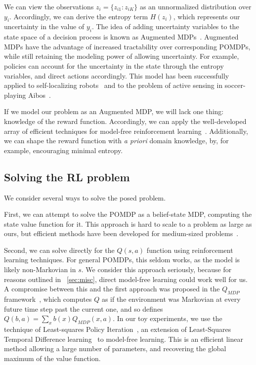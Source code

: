 We can view the observations $z_i = \{z_{i1}:z_{iK}\}$ as an unnormalized distribution over $y_i$.
Accordingly, we can derive the entropy term $H(z_i)$, which represents our uncertainty in the value of $y_i$.
The idea of adding uncertainty variables to the state space of a decision process is known as Augmented MDPs~\cite{Kwok2004,Roy1999}.
Augmented MDPs have the advantage of increased tractability over corresponding POMDPs, while still retaining the modeling power of allowing uncertainty.
For example, policies can account for the uncertainty in the state through the entropy variables, and direct actions accordingly.
This model has been successfully applied to self-localizing robots~\cite{Roy1999} and to the problem of active sensing in soccer-playing Aibos~\cite{Kwok2004}.

If we model our problem as an Augmented MDP, we will lack one thing: knowledge of the reward function.
Accordingly, we can apply the well-developed array of efficient techniques for model-free reinforcement learning~\cite{Sutton1998}.
Additionally, we can shape the reward function with \emph{a priori} domain knowledge, by, for example, encouraging minimal entropy.

\subsection{Solving the RL problem}
We consider several ways to solve the posed problem.

First, we can attempt to solve the POMDP as a belief-state MDP, computing the state value function for it.
This approach is hard to scale to a problem as large as ours, but efficient methods have been developed for medium-sized problems~\cite{Pineau2006}.

Second, we can solve directly for the $Q(s,a)$ function using reinforcement learning techniques.
For general POMDPs, this seldom works, as the model is likely non-Markovian in $s$.
We consider this approach seriously, because for reasons outlined in ~\autoref{sec:misc}, direct model-free learning could work well for us.
A compromise between this and the first approach was proposed in the $Q_{MDP}$ framework~\cite{Littman1995}, which computes $Q$ as if the environment was Markovian at every future time step past the current one, and so defines $Q(b,a) = \sum_x b(x) Q_{MDP}(x,a)$.
In our toy experiments, we use the technique of Least-squares Policy Iteration~\cite{Lagoudakis2003}, an extension of Least-Squares Temporal Difference learning~\cite{Boyan2002} to model-free learning.
This is an efficient linear method allowing a large number of parameters, and recovering the global maximum of the value function.

